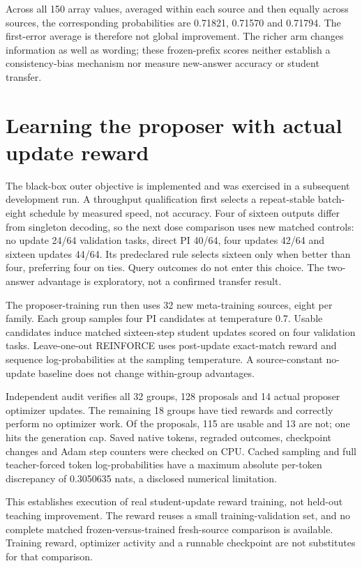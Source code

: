 \documentclass[11pt,letterpaper]{article}
\begin{document}
Across all 150 array values, averaged within each source and then equally across sources, the corresponding probabilities are 0.71821, 0.71570 and 0.71794. The first-error average is therefore not global improvement. The richer arm changes information as well as wording; these frozen-prefix scores neither establish a consistency-bias mechanism nor measure new-answer accuracy or student transfer.

\section{Learning the proposer with actual update reward}
\label{sec:proposer}

The black-box outer objective is implemented and was exercised in a subsequent development run. A throughput qualification first selects a repeat-stable batch-eight schedule by measured speed, not accuracy. Four of sixteen outputs differ from singleton decoding, so the next dose comparison uses new matched controls: no update 24/64 validation tasks, direct PI 40/64, four updates 42/64 and sixteen updates 44/64. Its predeclared rule selects sixteen only when better than four, preferring four on ties. Query outcomes do not enter this choice. The two-answer advantage is exploratory, not a confirmed transfer result.

The proposer-training run then uses 32 new meta-training sources, eight per family. Each group samples four PI candidates at temperature 0.7. Usable candidates induce matched sixteen-step student updates scored on four validation tasks. Leave-one-out REINFORCE uses post-update exact-match reward and sequence log-probabilities at the sampling temperature. A source-constant no-update baseline does not change within-group advantages.

Independent audit verifies all 32 groups, 128 proposals and 14 actual proposer optimizer updates. The remaining 18 groups have tied rewards and correctly perform no optimizer work. Of the proposals, 115 are usable and 13 are not; one hits the generation cap. Saved native tokens, regraded outcomes, checkpoint changes and Adam step counters were checked on CPU. Cached sampling and full teacher-forced token log-probabilities have a maximum absolute per-token discrepancy of 0.3050635 nats, a disclosed numerical limitation.

This establishes execution of real student-update reward training, not held-out teaching improvement. The reward reuses a small training-validation set, and no complete matched frozen-versus-trained fresh-source comparison is available. Training reward, optimizer activity and a runnable checkpoint are not substitutes for that comparison.
\end{document}
